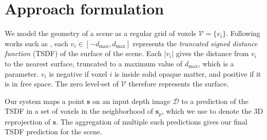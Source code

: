 \documentclass[10pt,twocolumn,letterpaper]{article}
\newcommand{\rgbdimage}{\mathcal{D}}
\newcommand{\pixelidx}{\mathbf{s}}
\newcommand{\voxelgrid}{\mathcal{V}}
\newcommand{\voxel}{v}
\newcommand{\voxidx}{i}
\newcommand{\project}{\mathbf{p}}
\renewcommand{\paragraph}{\vspace{2pt}\noindent\textbf}
\begin{document}


\section{Approach formulation}


We model the geometry of a scene as a regular grid of voxels $\voxelgrid = \{\voxel_\voxidx\}$.
Following works such as \cite{izadi-uist-2011, prisacariu-iccv-2011}, each $\voxel_\voxidx \in [-d_{\max}, d_{\max}]$ represents the \emph{truncated signed distance function} (TSDF) of the surface of the scene.
Each $|\voxel_\voxidx|$ gives the distance from $\voxel_\voxidx$ to the nearest surface, truncated to a maximum value of $d_{\max}$, which is a parameter. 
$\voxel_\voxidx$ is negative if voxel $\voxidx$ is inside solid opaque matter, and positive if it is in free space. 
The zero level-set of $\voxelgrid$ therefore represents the surface.

\newcommand{\voxregion}{\mathcal{R}}

Our system maps a point $\pixelidx$ on an input depth image $\rgbdimage$ to a prediction of the TSDF in a set of voxels in the neighborhood of $\pixelidx_p$, which we use to denote the 3D reprojection of $\pixelidx$.
The aggregation of multiple such predictions gives our final TSDF prediction for the scene.


\end{document}
